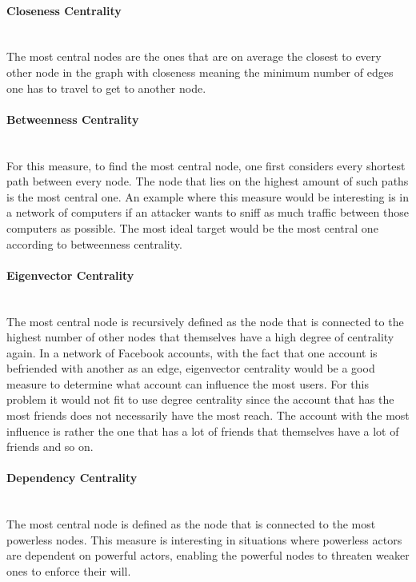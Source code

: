 \paragraph{Closeness Centrality}\mbox{} \medskip \\
The most central nodes are the ones that are on average the closest to every other node
in the graph with closeness meaning the minimum number of edges one has to travel to get to another node.

\paragraph{Betweenness Centrality}\mbox{} \medskip \\
For this measure, to find the most central node, one first considers every shortest
path between every node. The node that lies on the highest amount of such paths is the
most central one. An example where this measure would be interesting is in a network
of computers if an attacker wants to sniff as much traffic between those computers as possible.
The most ideal target would be the most central one according to betweenness centrality.

\paragraph{Eigenvector Centrality}\mbox{} \medskip \\
The most central node is recursively defined as the node that is connected to the highest number
of other nodes that themselves have a high degree of centrality again. In a network of Facebook
accounts, with the fact that one account is befriended with another as an edge, eigenvector centrality
would be a good measure to determine what account can influence the most users. For this problem it would
not fit to use degree centrality since the account that has the most friends does not necessarily
have the most reach. The account with the most influence is rather the one that has a lot of friends
that themselves have a lot of friends and so on.

\paragraph{Dependency Centrality}\mbox{} \medskip \\
The most central node is defined as the node that is connected to the most powerless nodes. This 
measure is interesting in situations where powerless actors are dependent on powerful actors, 
enabling the powerful nodes to threaten weaker ones to enforce their will.

